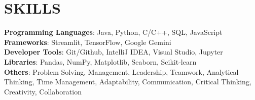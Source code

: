 \documentclass[letterpaper,11pt]{article}
\begin{document}
\section{\textbf{SKILLS}}
\begin{itemize}[leftmargin=0.15in, label={}]
    \small{\item{
     \textbf{Programming Languages}{: Java, Python, C/C++, SQL, JavaScript} \\
     \textbf{ Frameworks}{: Streamlit, TensorFlow, Google Gemini} \\
     \textbf{  Developer Tools}{: Git/Github, IntelliJ IDEA, Visual Studio, Jupyter} \\
     \textbf{  Libraries}{: Pandas, NumPy, Matplotlib, Seaborn, Scikit-learn} \\
     \textbf{  Others}{: Problem Solving, Management, Leadership, Teamwork, Analytical Thinking, Time Management, Adaptability, Communication, Critical Thinking, Creativity, Collaboration}
    }}
\end{itemize}
\end{document}
